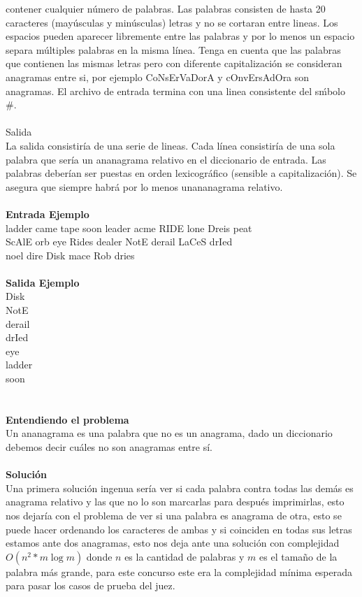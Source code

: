 \documentclass[12pt]{article}
\begin{document}
contener cualquier n\'umero de palabras. Las palabras consisten de hasta 20 caracteres (may\'usculas y min\'usculas) letras y no se cortaran entre lineas. Los espacios pueden aparecer libremente entre las palabras y por lo menos un espacio separa m\'ultiples palabras en la misma l\'inea. Tenga en cuenta que las palabras que contienen las mismas letras pero con diferente capitalizaci\'on se consideran anagramas entre si, por ejemplo CoNsErVaDorA y cOnvErsAdOra son anagramas. El archivo de entrada termina con una linea consistente del s\'mbolo \#.\\
\\
\textrm{\large Salida}
\\La salida consistir\'ia de una serie de lineas. Cada l\'inea consistir\'ia de una sola palabra que ser\'ia un ananagrama relativo en el diccionario de entrada. Las palabras deber\'ian ser puestas en orden lexicogr\'afico (sensible a capitalizaci\'on). Se asegura que siempre habr\'a por lo menos unananagrama relativo.\\
\\
\textbf{\large Entrada Ejemplo}
\\ladder came tape soon leader acme RIDE lone Dreis peat\\
ScAlE orb eye Rides dealer NotE derail LaCeS drIed\\
noel dire Disk mace Rob dries\\
\\
\textbf{\large Salida Ejemplo}
\\Disk\\
NotE\\
derail\\
drIed\\
eye\\
ladder\\
soon\\
\\
\\
\textbf{\large Entendiendo el problema}\\
Un ananagrama es una palabra que no es un anagrama, dado un diccionario debemos decir cuáles no son anagramas entre sí.\\
\\
\textbf{\large Solución}\\
Una primera solución ingenua sería ver si cada palabra contra
todas las demás es anagrama relativo y las que no lo son 
marcarlas para después imprimirlas, esto nos dejaría con el 
problema de ver si una palabra es anagrama de otra, esto se 
puede hacer ordenando los caracteres de ambas y si coinciden en
todas sus letras estamos ante dos anagramas, esto nos deja 
ante una solución con complejidad $O(n^2 * m \log m)$ donde 
$n$ es la cantidad de palabras y $m$ es el tamaño de la 
palabra más grande, para este concurso este era la 
complejidad mínima esperada para pasar los casos de prueba 
del juez.
\end{document}
